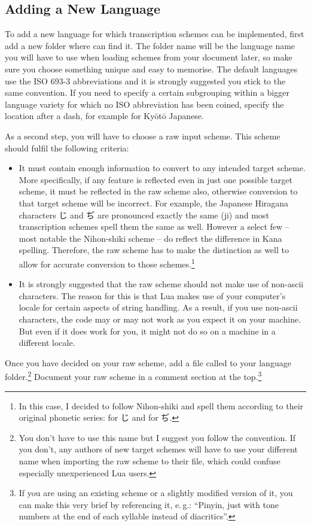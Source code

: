 \documentclass{ltxdockit}
\begin{document}
\subsection{Adding a New Language}

To add a new language for which transcription schemes can be implemented, first
add a new folder where \transconv{} can find it. The folder name will be the
language name you will have to use when loading schemes from your document
later, so make sure you choose something unique and easy to memorise. The
default languages use the ISO 693-3 abbreviations and it is strongly suggested you
stick to the same convention. If you need to specify a certain subgrouping
within a bigger language variety for which no ISO abbreviation has been coined,
specify the location after a dash, for example  for
Ky\={o}t\={o} Japanese.

As a second step, you will have to choose a raw input scheme. This scheme should
fulfil the following criteria:

\begin{itemize}
  \item It must contain enough information to convert to any intended target
    scheme. More specifically, if any feature is reflected even in just one
    possible target scheme, it must be reflected in the raw scheme also,
    otherwise conversion to that target scheme will be incorrect. For example,
    the Japanese Hiragana characters じ and ぢ are pronounced exactly the same
    (ji) and most transcription schemes spell them the same as well. However
    a select few -- most notable the Nihon-shiki scheme -- do reflect the
    difference in Kana spelling. Therefore, the raw scheme has to make the
    distinction as well to allow for accurate conversion to those
    schemes.\footnote{In this case, I decided to follow Nihon-shiki and spell
    them according to their original phonetic series:  for じ and
     for ぢ.}
  \item It is strongly suggested that the raw scheme should not make use of
    non-ascii characters. The reason for this is that Lua makes use of your
    computer's locale for certain aspects of string handling. As a result, if you
    use non-ascii characters, the code may or may not work as you expect it on
    your machine. But even if it does work for you, it might not do so on
    a machine in a different locale.
\end{itemize}

Once you have decided on your raw scheme, add a file called  to
your language folder.\footnote{You don't have to use this name but I suggest
you follow the convention. If you don't, any authors of new target schemes
will have to use your different name when importing the raw scheme to their
file, which could confuse especially unexperienced Lua users.} Document your raw
scheme in a comment section at the top.\footnote{If you are using an existing
scheme or a slightly modified version of it, you can make this very brief by
referencing it, e.\,g.: \enquote{Pinyin, just with tone numbers at the end of
each syllable instead of diacritics}.}
\end{document}

